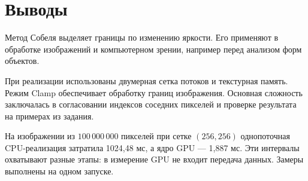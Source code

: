 \documentclass[12pt,a4paper]{article}
\begin{document}
\clearpage
\section{Выводы}
Метод Собеля выделяет границы по изменению яркости. Его применяют в обработке изображений и компьютерном зрении, например перед анализом форм объектов.

При реализации использованы двумерная сетка потоков и текстурная память. Режим Clamp обеспечивает обработку границ изображения. Основная сложность заключалась в согласовании индексов соседних пикселей и проверке результата на примерах из задания.

На изображении из $100\,000\,000$ пикселей при сетке $(256,256)$ однопоточная CPU-реализация затратила 1024{,}48 мс, а ядро GPU --- 1{,}887 мс. Эти интервалы охватывают разные этапы: в измерение GPU не входит передача данных. Замеры выполнены на одном запуске.
\end{document}
